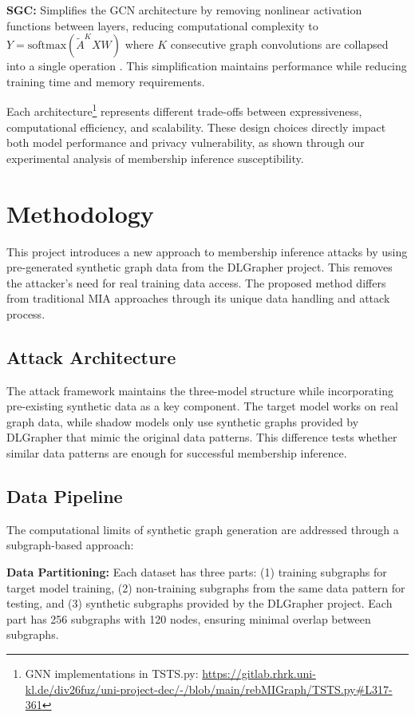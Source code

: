 \documentclass{article}
\begin{document}
\textbf{SGC:} Simplifies the GCN architecture by removing nonlinear activation functions between layers, reducing computational complexity to $Y = \text{softmax}(\tilde{A}^KXW)$ where $K$ consecutive graph convolutions are collapsed into a single operation \cite{wu2019simplifying}. This simplification maintains performance while reducing training time and memory requirements.

Each architecture\footnote{GNN implementations in TSTS.py: \url{https://gitlab.rhrk.uni-kl.de/div26fuz/uni-project-dec/-/blob/main/rebMIGraph/TSTS.py\#L317-361}} represents different trade-offs between expressiveness, computational efficiency, and scalability. These design choices directly impact both model performance and privacy vulnerability, as shown through our experimental analysis of membership inference susceptibility.

\section{Methodology}
This project introduces a new approach to membership inference attacks by using pre-generated synthetic graph data from the DLGrapher project. This removes the attacker's need for real training data access. The proposed method differs from traditional MIA approaches through its unique data handling and attack process.

\subsection{Attack Architecture}
The attack framework maintains the three-model structure while incorporating pre-existing synthetic data as a key component. The target model works on real graph data, while shadow models only use synthetic graphs provided by DLGrapher that mimic the original data patterns. This difference tests whether similar data patterns are enough for successful membership inference.

\subsection{Data Pipeline}
The computational limits of synthetic graph generation are addressed through a subgraph-based approach:

\textbf{Data Partitioning:} Each dataset has three parts: (1) training subgraphs for target model training, (2) non-training subgraphs from the same data pattern for testing, and (3) synthetic subgraphs provided by the DLGrapher project. Each part has 256 subgraphs with 120 nodes, ensuring minimal overlap between subgraphs.
\end{document}
